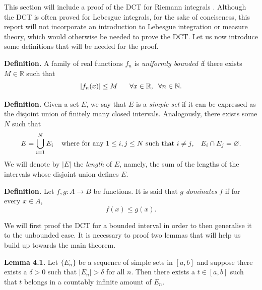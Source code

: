 \documentclass[12pt]{article}
\begin{document}
\noindent This section will include a proof of the DCT for Riemann integrals \cite{r6}. Although the DCT is often proved for Lebesgue integrals, for the sake of conciseness, this report will not incorporate an introduction to Lebesgue integration or measure theory, which would otherwise be needed to prove the DCT. Let us now introduce some definitions that will be needed for the proof.

\vspace{5mm}

\noindent\textbf{Definition.} A family of real functions $f_n$ is \textit{uniformly bounded} \textit if there exists $M\in\mathbb{R}$ such that$$|f_n(x)|\leq M\hspace{6mm}\forall x\in\mathbb{R}, \hspace{2mm}\forall n\in\mathbb{N}.$$

\vspace{5mm}

\noindent\textbf{Definition.} Given a set $E$, we say that $E$ is a \textit{simple set} if it can be expressed as the disjoint union of finitely many closed intervals. Analogously, there exists some $N$ such that $$E=\bigcup_{i=1}^NE_i\hspace{4mm}\text{where for any $1\leq i,j\leq N$ such that $i\neq j$},\hspace{3mm}E_i\cap E_j=\varnothing.$$ We will denote by $|E|$ the \textit{length} of $E$, namely, the sum of the lengths of the intervals whose disjoint union defines $E$.

\vspace{5mm}

\noindent\textbf{Definition.} Let $f, g:A\to B$ be functions. It is said that $g$ \textit{dominates} $f$ if for every $x\in A$, $$f(x)\leq g(x).$$

\noindent We will first proof the DCT for a bounded interval in order to then generalise it to the unbounded case. It is necessary to proof two lemmas that will help us build up towards the main theorem. 

\vspace{5mm}

\noindent\textbf{Lemma 4.1.} Let $\{E_n\}$ be a sequence of simple sets in $[a,b]$ and suppose there exists a $\delta>0$ such that $|E_n|>\delta$ for all $n$. Then there exists a $t\in[a,b]$ such that $t$ belongs in a countably infinite amount of $E_n$.

\vspace{5mm}
\end{document}
